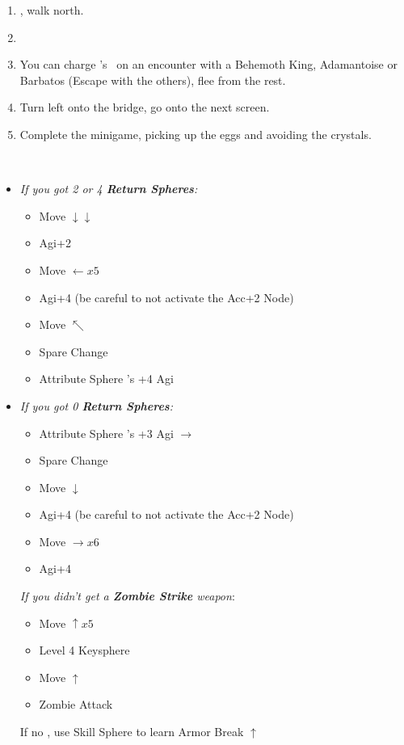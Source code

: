 \begin{enumerate}[resume]
    \item \sd, walk north.
    \item \formation{\tidus}{\kimahri}{\auron}
    \item You can charge \rikku's \od\ on an encounter with a Behemoth King, Adamantoise or Barbatos (Escape with the others), flee from the rest.
    \item Turn left onto the bridge, go onto the next screen.
    \item Complete the minigame, picking up the eggs and avoiding the crystals.
\end{enumerate}
\bothvfill\winvfill\lossvfill
\ 
\begin{spheregrid}
    \begin{itemize}
        \item \textit{If you got 2 or 4 \textbf{Return Spheres}:}
        \begin{itemize}
            \item Move $\downarrow\downarrow$
            \item Agi+2
            \item Move $\leftarrow x5$
            \item Agi+4 (be careful to not activate the Acc+2 Node)
            \item Move $\nwarrow$
            \item Spare Change
            \item Attribute Sphere \kimahri's +4 Agi
        \end{itemize}
        \item \textit{If you got 0 \textbf{Return Spheres}:}
        \begin{itemize}
            \item Attribute Sphere \rikku's +3 Agi $\rightarrow$
            \item Spare Change
            \item Move $\downarrow$
            \item Agi+4 (be careful to not activate the Acc+2 Node)
            \item Move $\rightarrow x6$
            \item Agi+4
        \end{itemize}
        \tidusf \textit{If you didn't get a \textbf{Zombie Strike} weapon}:
        \begin{itemize}
            \item Move $\uparrow x5$
            \item Level 4 Keysphere
            \item Move $\uparrow$
            \item Zombie Attack
        \end{itemize}
        \rikkuf If no \od, use Skill Sphere to learn Armor Break $\uparrow$
    \end{itemize}
\end{spheregrid}
